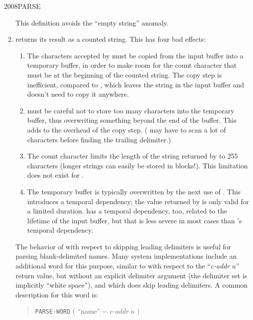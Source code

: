 \begin{newword}{2008}{PARSE}
\begin{rationale}
\begin{enumerate}
			This definition avoids the ``empty string'' anomaly.

		\item {} returns its result as a counted string.
			This has four bad effects:

			\begin{enumerate}
			\item The characters accepted by  must be
				copied from the input buffer into a temporary buffer,
				in order to make room for the count character that
				must be at the beginning of the counted string. The
				copy step is inefficient, compared to ,
				which leaves the string in the input buffer and doesn't
				need to copy it anywhere.

			\item {} must be careful not to store too many
				characters into the temporary buffer, thus overwriting
				something beyond the end of the buffer. This adds to
				the overhead of the copy step. ( may have
				to scan a lot of characters before finding the trailing
				delimiter.)

			\item The count character limits the length of the string
				returned by  to 255 characters (longer
				strings can easily be stored in blocks!). This
				limitation does not exist for .

			\item The temporary buffer is typically overwritten by the
				next use of . This introduces a temporal
				dependency; the value returned by  is only
				valid for a limited duration.  has a
				temporal dependency, too, related to the lifetime of
				the input buffer, but that is less severe in most
				cases than 's temporal dependency.
			\end{enumerate}

			The behavior of  with respect to skipping
			leading delimiters is useful for parsing blank-delimited
			names. Many system implementations include an additional
			word for this purpose, similar to  with respect
			to the ``\emph{c-addr} $u$'' return value, but without an
			explicit delimiter argument (the delimiter set is implicitly
			``white space''), and which does skip leading delimiters. A
			common description for this word is:

			\begin{quote}
				\texttt{PARSE-WORD} \qquad
					( ``name'' -{}- \emph{c-addr} $u$ ) \\


\end{quote}
\end{enumerate}
\end{rationale}
\end{newword}
